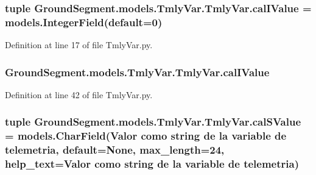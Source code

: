 \subsubsection[{cal\+I\+Value}]{\setlength{\rightskip}{0pt plus 5cm}tuple Ground\+Segment.\+models.\+Tmly\+Var.\+Tmly\+Var.\+cal\+I\+Value = models.\+Integer\+Field(default=0)\hspace{0.3cm}{\ttfamily [static]}}\label{class_ground_segment_1_1models_1_1_tmly_var_1_1_tmly_var_aee293dd968b0fa7700f66475eea0e32e}


Definition at line 17 of file Tmly\+Var.\+py.

\hypertarget{class_ground_segment_1_1models_1_1_tmly_var_1_1_tmly_var_a11e7f1de5e00c2422fc42474312d8e23}{}
\subsubsection[{cal\+I\+Value}]{\setlength{\rightskip}{0pt plus 5cm}Ground\+Segment.\+models.\+Tmly\+Var.\+Tmly\+Var.\+cal\+I\+Value}\label{class_ground_segment_1_1models_1_1_tmly_var_1_1_tmly_var_a11e7f1de5e00c2422fc42474312d8e23}


Definition at line 42 of file Tmly\+Var.\+py.

\hypertarget{class_ground_segment_1_1models_1_1_tmly_var_1_1_tmly_var_a49dc6e8d2412bdc61c595b4bdc3c2cbc}{}
\subsubsection[{cal\+S\+Value}]{\setlength{\rightskip}{0pt plus 5cm}tuple Ground\+Segment.\+models.\+Tmly\+Var.\+Tmly\+Var.\+cal\+S\+Value = models.\+Char\+Field(\textquotesingle{}Valor como string de la variable de telemetria\textquotesingle{}, default=None, max\+\_\+length=24, help\+\_\+text=\textquotesingle{}Valor como string de la variable de telemetria\textquotesingle{})\hspace{0.3cm}{\ttfamily [static]}}\label{class_ground_segment_1_1models_1_1_tmly_var_1_1_tmly_var_a49dc6e8d2412bdc61c595b4bdc3c2cbc}


